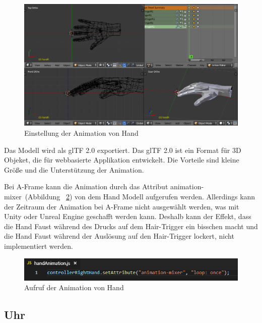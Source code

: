 \begin{figure}[ht]
\vspace*{0.2cm}
\centering
\includegraphics[width=\textwidth]{images/handKeyframes.png}
\caption[Einstellung der Animation von Hand]{Einstellung der Animation von Hand}
\label{fig:handKeyframes} 
\end{figure}
 
 Das Modell wird als glTF 2.0 exportiert. Das glTF 2.0 ist ein Format für 3D Objeket, die für webbasierte Applikation entwickelt. Die Vorteile sind kleine Größe und die Unterstützung der Animation.
 
 Bei A-Frame kann die Animation durch das Attribut \glqq animation-mixer\grqq\ (Abbildung ~\ref{fig:handAnimation}) von dem Hand Modell aufgerufen werden. Allerdings kann der Zeitraum der Animation bei A-Frame nicht ausgewählt werden, was mit Unity oder Unreal Engine geschafft werden kann. Deshalb kann der Effekt, dass die Hand Faust während des Drucks auf dem Hair-Trigger ein bisschen macht und die Hand Faust während der Auslösung auf den Hair-Trigger lockert, nicht implementiert werden.
 
\begin{figure}[ht]
\vspace*{0.2cm}
\centering
\includegraphics[width=\textwidth]{images/handAnimation.png}
\caption[Aufruf der Animation von Hand]{Aufruf der Animation von Hand}
\label{fig:handAnimation} 
\end{figure}
 
 \subsection{Uhr}
 
